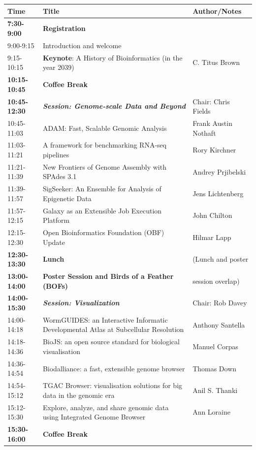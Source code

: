 \documentclass[10pt,oneside]{article}
\begin{document}
\begin{center}
\begin{tabular}{|p{2.0cm}|p{10cm}|p{3.3cm}|}
\hline
Time & Title & Author/Notes \\
\hline
\textbf{7:30-9:00} & \textbf{Registration} &\\
\hline
9:00-9:15 & Introduction and welcome &\\
9:15-10:15 & \textbf{Keynote}: A History of Bioinformatics (in the year 2039) & C. Titus Brown\\
\hline
\textbf{10:15-10:45} & \textbf{Coffee Break} &\\
\hline
\textbf{10:45-12:30} & \textbf{\textit{Session: Genome-scale Data and Beyond}} & Chair: Chris Fields\\
10:45-11:03 & ADAM: Fast, Scalable Genomic Analysis & Frank Austin Nothaft\\
11:03-11:21 & A framework for benchmarking RNA-seq pipelines & Rory Kirchner\\
11:21-11:39 & New Frontiers of Genome Assembly with SPAdes 3.1 & Andrey Prjibelski\\
11:39-11:57 & SigSeeker: An Ensemble for Analysis of Epigenetic Data & Jens Lichtenberg\\
11:57-12:15 & Galaxy as an Extensible Job Execution Platform & John Chilton\\
\hline
12:15-12:30 & Open Bioinformatics Foundation (OBF) Update & Hilmar Lapp\\
\hline
\textbf{12:30-13:30} & \textbf{Lunch} & (Lunch and poster\\
\textbf{13:00-14:00} & \textbf{Poster Session and Birds of a Feather (BOFs)} & session overlap)\\
\hline
\textbf{14:00-15:30} & \textbf{\textit{Session: Visualization}} & Chair: Rob Davey\\
14:00-14:18 & WormGUIDES: an Interactive Informatic Developmental Atlas at Subcellular Resolution & Anthony Santella\\
14:18-14:36 & BioJS: an open source standard for biological visualisation & Manuel Corpas\\
14:36-14:54 & Biodalliance: a fast, extensible genome browser & Thomas Down\\
14:54-15:12 & TGAC Browser: visualisation solutions for big data in the genomic era & Anil S. Thanki\\
15:12-15:30 & Explore, analyze, and share genomic data using Integrated Genome Browser & Ann Loraine\\
\hline
\textbf{15:30-16:00} & \textbf{Coffee Break} &\\

\end{tabular}
\end{center}
\end{document}
